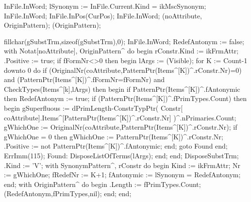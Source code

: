    InFile.InWord;
   lSynonym := InFile.Current.Kind = ikMscSynonym;
   InFile.InWord;
   InFile.InPos(CurPos); InFile.InWord;
   (noAttribute, OriginPattern);
   (OriginPattern);
   
   fillchar(gSubstTrm,sizeof(gSubstTrm),0);
   InFile.InWord;
   RedefAntonym := false;
   with Notat[noAttribute], OriginPattern^ do
   begin
      rConstr.Kind := ikFrmAttr;
      .Positive := true;
      if fFormNr<>0 then
      begin
         lArgs := (Visible);
         for K := Count-1 downto 0 do
            if (OriginalNr(coAttribute,PatternPtr(Items^[K])^.rConstr.Nr)=0) and
                  (PatternPtr(Items^[K])^.fFormNr=fFormNr) and
                  CheckTypes(Items^[k],lArgs) then
            begin
               if PatternPtr(Items^[K])^.fAntonymic then RedefAntonym := true;
               if (PatternPtr(Items^[K])^.fPrimTypes.Count) then
               begin
                  gSuperfluous := dPrimLength-ConstrTypPtr(
                     Constr[ coAttribute].Items^[PatternPtr(Items^[K])^.rConstr.Nr]
                                                          )^.nPrimaries.Count;
                  gWhichOne := OriginalNr(coAttribute,PatternPtr(Items^[K])^.rConstr.Nr);
                  if gWhichOne = 0 then
                     gWhichOne := PatternPtr(Items^[K])^.rConstr.Nr;
                  .Positive :=  not PatternPtr(Items^[K])^.fAntonymic;
               end;
               goto Found
            end;
         ErrImm(115);
         Found:
            DisposeListOfTerms(lArgs);
      end;
   end;
   DisposeSubstTrm;
   .Kind := 'V';
   with SynonymPattern^, rConstr do
   begin
      Kind := ikFrmAttr;
      Nr := gWhichOne;
      fRedefNr :=  K+1;
      fAntonymic := lSynonym = RedefAntonym;
  end;
   with OriginPattern^ do
   begin
      .Length := fPrimTypes.Count;
      (RedefAntonym,fPrimTypes,nil);
   end;
end;
\eatline

